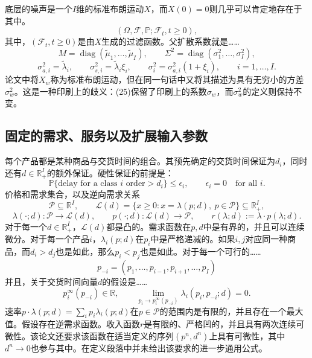\documentclass[11pt]{article}
\begin{document}
底层的噪声是一个\(I\)维的标准布朗运动\(X\)，而\(X(0)=0\)则几乎可以肯定地存在于其中。
\[
(\Omega,\mathcal F,\mathbb P;\mathcal F_t,t\geq0),
\]
其中，\((\mathcal F_t,t\geq0)\)是由\(X\)生成的过滤函数。父扩散系数就是……
\[
M=\operatorname{diag}(\tilde\mu_1,\ldots,\tilde\mu_I),
\qquad
\Sigma^2=\operatorname{diag}(\sigma_1^2,\ldots,\sigma_I^2),
\]
\[
\sigma_{a,i}^2=\tilde\lambda_i,
\qquad \sigma_{s,i}^2=\tilde\lambda_i\xi_i,
\qquad \sigma_i^2=\sigma_{a,i}^2(1+\xi_i),
\qquad i=1,\ldots,I.
\]
论文中将\(X_w\)称为标准布朗运动，但在同一句话中又将其描述为具有无穷小的方差\(\sigma_w^2\)。这是一种印刷上的歧义：(25)保留了印刷上的系数\(\sigma_w\)，而\(\sigma_w^2\)的定义则保持不变。

\subsection*{固定的需求、服务以及扩展输入参数}

每个产品都是某种商品与交货时间的组合。其预先确定的交货时间保证为\(d_i\)，同时还有\(d\in\mathbb R_+^I\)的额外保证。硬性保证的前提是：
\[
\mathbb P\{\text{delay for a class }i\text{ order}>d_i\}\leq\epsilon_i,
\qquad \epsilon_i=0\quad\text{for all }i.
\]
价格和需求集合，以及逆向需求关系
\[
\mathcal P\subseteq\mathbb R^I,
\qquad
\mathcal L(d)=\{x\geq0:x=\lambda(p;d),\ p\in\mathcal P\}
\subseteq\mathbb R_+^I,
\]
\[
\lambda(\cdot;d):\mathcal P\longrightarrow\mathcal L(d),
\qquad
p(\cdot;d):\mathcal L(d)\longrightarrow\mathcal P,
\qquad
r(\lambda;d):=\lambda\cdot p(\lambda;d).
\]
对于每一个\(d\in\mathbb R_+^I\)，\(\mathcal L(d)\)都是凸的。需求函数在\(p,d\)中是有界的，并且可以连续微分。对于每一个产品\(i\)，\(\lambda_i(p;d)\)在\(p_i\)中是严格递减的。如果\(i,j\)对应同一种商品，而\(d_i>d_j\)也是如此，那么\(p_i<p_j\)也是如此。对于每一个可行的……
\[
p_{-i}=(p_1,\ldots,p_{i-1},p_{i+1},\ldots,p_I)
\]
并且，关于交货时间向量\(d\)的假设是……
\[
p_i^\infty(p_{-i})\in\mathbb R,
\qquad
\lim_{p_i\to p_i^\infty(p_{-i})}
\lambda_i(p_i,p_{-i};d)=0.
\]
速率\(p\cdot\lambda(p;d)=\sum_i p_i\lambda_i(p;d)\)在\(p\in\mathcal P\)的范围内是有限的，并且存在一个最大值。假设存在逆需求函数。收入函数\(r\)是有限的、严格凹的，并且具有两次连续可微性。该论文还要求该函数在适当定义的序列\((p^n,d^n)\)上具有可微性，其中\(d^n\to0\)也参与其中。在定义段落中并未给出该要求的进一步通用公式。
\end{document}
